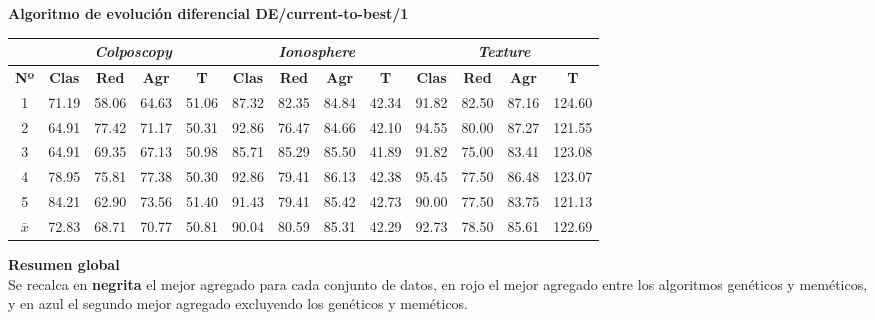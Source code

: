 \documentclass[12pt]{article}
\begin{document}
\textbf{Algoritmo de evolución diferencial DE/current-to-best/1}

\begin{table}[ht!]
\begin{tabular}{ccccc|cccc|cccc}
\centering
 & \multicolumn{4}{c}{\textit{Colposcopy}} & \multicolumn{4}{c}{\textit{Ionosphere}} & \multicolumn{4}{c}{\textit{Texture}} \\ \hline
\textbf{Nº} & \textbf{Clas} & \textbf{Red} & \textbf{Agr} & \textbf{T} & \textbf{Clas} & \textbf{Red} & \textbf{Agr} & \textbf{T} & \textbf{Clas} & \textbf{Red} & \textbf{Agr} & \textbf{T} \\ \hline
1 & 71.19 & 58.06 & 64.63 & 51.06 & 87.32 & 82.35 & 84.84 & 42.34 & 91.82 & 82.50 & 87.16 & 124.60\\
2 & 64.91 & 77.42 & 71.17 & 50.31 & 92.86 & 76.47 & 84.66 & 42.10 & 94.55 & 80.00 & 87.27 & 121.55\\
3 & 64.91 & 69.35 & 67.13 & 50.98 & 85.71 & 85.29 & 85.50 & 41.89 & 91.82 & 75.00 & 83.41 & 123.08\\
4 & 78.95 & 75.81 & 77.38 & 50.30 & 92.86 & 79.41 & 86.13 & 42.38 & 95.45 & 77.50 & 86.48 & 123.07\\
5 & 84.21 & 62.90 & 73.56 & 51.40 & 91.43 & 79.41 & 85.42 & 42.73 & 90.00 & 77.50 & 83.75 & 121.13\\
\hline 
$\bar{x}$  & 72.83 & 68.71 & 70.77 & 50.81 & 90.04 & 80.59 & 85.31 & 42.29 & 92.73 & 78.50 & 85.61 & 122.69
\end{tabular}
\end{table}

\newpage
\textbf{Resumen global}\\

Se recalca en \textbf{negrita} el mejor agregado para cada conjunto de datos, en {\color{red}rojo} el mejor agregado entre los algoritmos genéticos y meméticos, y en {\color{blue} azul} el segundo mejor agregado excluyendo los genéticos y meméticos.
\end{document}

